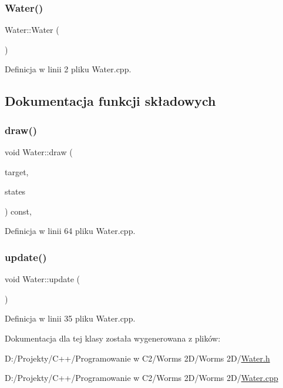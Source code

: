 \subsubsection{\texorpdfstring{Water()}{Water()}}
{\footnotesize\ttfamily Water\+::\+Water (\begin{DoxyParamCaption}{ }\end{DoxyParamCaption})}



Definicja w linii 2 pliku Water.\+cpp.



\subsection{Dokumentacja funkcji składowych}
\mbox{\label{class_water_a4a929b9c339c55d6c7bcabe79349bae8}} 
\subsubsection{\texorpdfstring{draw()}{draw()}}
{\footnotesize\ttfamily void Water\+::draw (\begin{DoxyParamCaption}\item[{sf\+::\+Render\+Target \&}]{target,  }\item[{sf\+::\+Render\+States}]{states }\end{DoxyParamCaption}) const\hspace{0.3cm}{\ttfamily [override]}, {\ttfamily [protected]}}



Definicja w linii 64 pliku Water.\+cpp.

\mbox{\label{class_water_a18fce2c0b2c45ee4ea8e413fcb4bdafa}} 
\subsubsection{\texorpdfstring{update()}{update()}}
{\footnotesize\ttfamily void Water\+::update (\begin{DoxyParamCaption}{ }\end{DoxyParamCaption})}



Definicja w linii 35 pliku Water.\+cpp.



Dokumentacja dla tej klasy została wygenerowana z plików\+:\begin{DoxyCompactItemize}
\item 
D\+:/\+Projekty/\+C++/\+Programowanie w C2/\+Worms 2\+D/\+Worms 2\+D/\mbox{\hyperlink{_water_8h}{Water.\+h}}\item 
D\+:/\+Projekty/\+C++/\+Programowanie w C2/\+Worms 2\+D/\+Worms 2\+D/\mbox{\hyperlink{_water_8cpp}{Water.\+cpp}}\end{DoxyCompactItemize}
